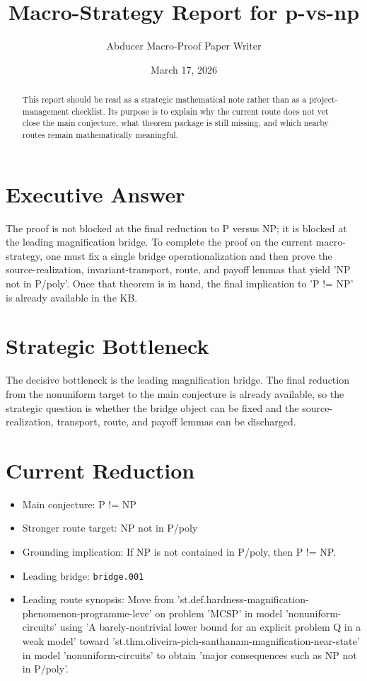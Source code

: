 \documentclass[11pt]{article}
\title{Macro-Strategy Report for p-vs-np}
\author{Abducer Macro-Proof Paper Writer}
\date{March 17, 2026}
\begin{document}
\maketitle

\begin{abstract}
This report should be read as a strategic mathematical note rather than as a project-management checklist. Its purpose is to explain why the current route does not yet close the main conjecture, what theorem package is still missing, and which nearby routes remain mathematically meaningful.
\end{abstract}

\section{Executive Answer}
The proof is not blocked at the final reduction to P versus NP; it is blocked at the leading magnification bridge. To complete the proof on the current macro-strategy, one must fix a single bridge operationalization and then prove the source-realization, invariant-transport, route, and payoff lemmas that yield 'NP not in P/poly'. Once that theorem is in hand, the final implication to 'P != NP' is already available in the KB.

\section{Strategic Bottleneck}
The decisive bottleneck is the leading magnification bridge. The final reduction from the nonuniform target to the main conjecture is already available, so the strategic question is whether the bridge object can be fixed and the source-realization, transport, route, and payoff lemmas can be discharged.

\section{Current Reduction}
\begin{itemize}[leftmargin=*,itemsep=0.2em]
\item Main conjecture: P != NP
\item Stronger route target: NP not in P/poly
\item Grounding implication: If NP is not contained in P/poly, then P != NP.
\item Leading bridge: \texttt{bridge.001}
\item Leading route synopsis: Move from 'st.def.hardness-magnification-phenomenon-programme-leve' on problem 'MCSP' in model 'nonuniform-circuits' using 'A barely-nontrivial lower bound for an explicit problem Q in a weak model' toward 'st.thm.oliveira-pich-santhanam-magnification-near-state' in model 'nonuniform-circuits' to obtain 'major consequences such as NP not in P/poly'.
\end{itemize}
\end{document}
